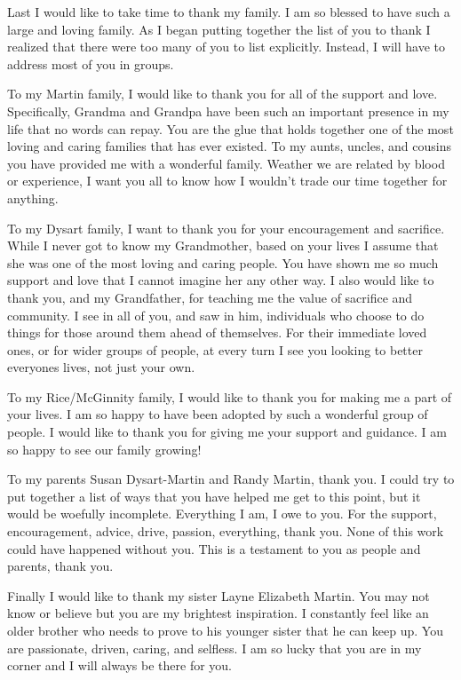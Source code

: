 \begin{frontmatter}
\begin{acknowledgement}
Last I would like to take time to thank my family. I am so blessed to have such a large and loving family. As I began putting together the list of you to thank I realized that there were too many of you to list explicitly. Instead, I will have to address most of you in groups.

To my Martin family, I would like to thank you for all of the support and love. Specifically, Grandma and Grandpa have been such an important presence in my life that no words can repay. You are the glue that holds together one of the most loving and caring families that has ever existed. To my aunts, uncles, and cousins you have provided me with a wonderful family. Weather we are related by blood or experience, I want you all to know how I wouldn't trade our time together for anything.

To my Dysart family, I want to thank you for your encouragement and sacrifice. While I never got to know my Grandmother, based on your lives I assume that she was one of the most loving and caring people. You have shown me so much support and love that I cannot imagine her any other way. I also would like to thank you, and my Grandfather, for teaching me the value of sacrifice and community. I see in all of you, and saw in him, individuals who choose to do things for those around them ahead of themselves. For their immediate loved ones, or for wider groups of people, at every turn I see you looking to better everyones lives, not just your own.

To my Rice/McGinnity family, I would like to thank you for making me a part of your lives. I am so happy to have been adopted by such a wonderful group of people. I would like to thank you for giving me your support and guidance. I am so happy to see our family growing!

To my parents Susan Dysart-Martin and Randy Martin, thank you. I could try to put together a list of ways that you have helped me get to this point, but it would be woefully incomplete. Everything I am, I owe to you. For the support, encouragement, advice, drive, passion, everything, thank you. None of this work could have happened without you. This is a testament to you as people and parents, thank you.

Finally I would like to thank my sister Layne Elizabeth Martin. You may not know or believe but you are my brightest inspiration. I constantly feel like an older brother who needs to prove to his younger sister that he can keep up. You are passionate, driven, caring, and selfless. I am so lucky that you are in my corner and I will always be there for you.

\end{acknowledgement}



\tableofcontents

\listoftables

\listoffigures

\end{frontmatter}